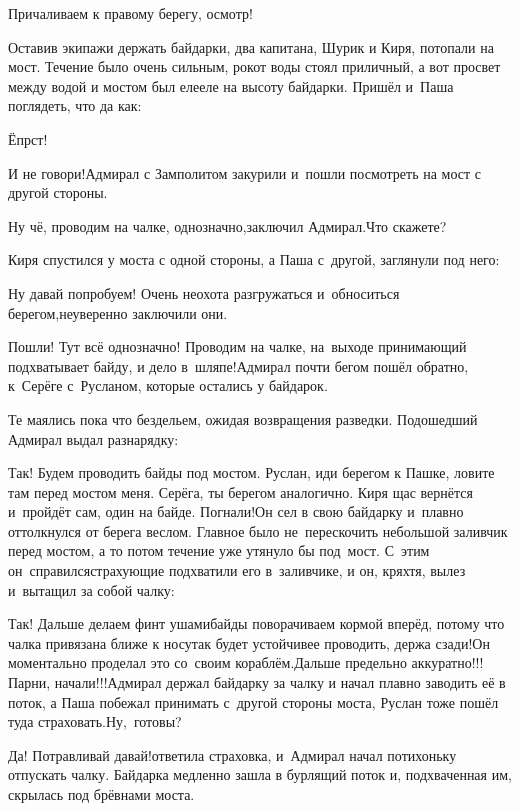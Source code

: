 \diagdash Причаливаем к правому берегу, осмотр!

Оставив экипажи держать байдарки, два капитана, Шурик и Киря, потопали на мост. Течение было очень сильным, рокот воды стоял приличный, а вот просвет между водой и мостом был еле\sdash еле на высоту байдарки. Пришёл и~Паша поглядеть, что да как:

\diagdash Ёпрст!

\diagdash И не говори!\mdash Адмирал с Замполитом закурили и~пошли посмотреть на мост с другой стороны.

\diagdash Ну чё, проводим на чалке, однозначно,\mdash заключил Адмирал.\mdash Что скажете?

Киря спустился у моста с одной стороны, а Паша с~другой, заглянули под него:

\diagdash Ну давай попробуем! Очень неохота разгружаться и~обноситься берегом,\mdash неуверенно заключили они.

\diagdash Пошли! Тут всё однозначно! Проводим на чалке, на~выходе принимающий подхватывает байду, и дело в~шляпе!\mdash Адмирал почти бегом пошёл обратно, к~Серёге с~Русланом, которые остались у байдарок.

Те маялись пока что бездельем, ожидая возвращения разведки. Подошедший Адмирал выдал разнарядку:

\diagdash Так! Будем проводить байды под мостом. Руслан, иди берегом к Пашке, ловите там перед мостом меня. Серёга, ты берегом аналогично. Киря щас вернётся и~пройдёт сам, один на байде. Погнали!\mdash Он сел в свою байдарку и~плавно оттолкнулся от берега веслом. Главное было не~перескочить небольшой заливчик перед мостом, а то потом течение уже утянуло бы под~мост. С~этим он~справился\mdash страхующие подхватили его в~заливчике, и он, кряхтя, вылез и~вытащил за собой чалку:

\diagdash Так! Дальше делаем финт ушами\mdash байды поворачиваем кормой вперёд, потому что чалка привязана ближе к носу\mdash так будет устойчивее проводить, держа сзади!\mdash Он моментально проделал это со~своим кораблём.\mdash Дальше предельно аккуратно!!! Парни, начали!!!\mdash Адмирал держал байдарку за чалку и начал плавно заводить её в поток, а Паша побежал принимать с~другой стороны моста, Руслан тоже пошёл туда страховать.\mdash Ну,~готовы?

\diagdash Да! Потравливай давай!\mdash ответила страховка, и~Адмирал начал потихоньку отпускать чалку. Байдарка медленно зашла в бурлящий поток и, подхваченная им, скрылась под брёвнами моста.

